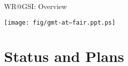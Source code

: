 \documentclass[compress,red]{beamer}
\begin{document}
\begin{frame}{WR@GSI: Overview}


      \begin{center}
	\texttt{[image: fig/gmt-at--fair.ppt.ps]}
      \end{center}  

\end{frame}



\section{Status and Plans}
\end{document}
